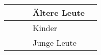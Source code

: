\begin{longtable}{|l|l|l|l|l|l|}
     &                    &            & \multicolumn{2}{l|}{Ältere   Leute}                         &                                                                                                                                                                                                                                                                                                                                                                                                                                                                                                                                                                                                                                                                                                         \\ \hline
     &                    &            & \multicolumn{2}{l|}{Kinder}                                 &                                                                                                                                                                                                                                                                                                                                                                                                                                                                                                                                                                                                                                                                                                         \\ \hline
     &                    &            & \multicolumn{2}{l|}{Junge Leute}                            &                                                                                                                                                                                                                                                                                                                                                                                                                                                                                                                                                                                                                                                                                                         \\ \hline

\end{longtable}
